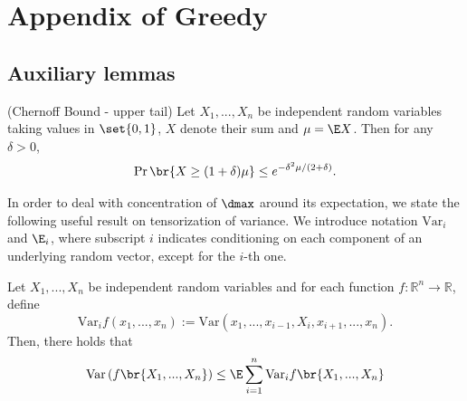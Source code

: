 \chapter{Appendix of Greedy}
\section{Auxiliary lemmas}\label{appendix:aux_lemmas}
%
\begin{lemma}\label{lemma:chernoff}(Chernoff Bound - upper tail)
Let $X_1, ..., X_n$ be independent random variables taking values in $\set{0, 1}$, $X$ denote their sum and $\mu = \E X$. Then for any $\delta > 0$,
    \begin{align*}
        \Pr\br{X \geq (1+\delta)\mu}\leq e^{-\delta^2 \mu / (2+\delta)}.
    \end{align*}
\end{lemma}


\noindent
In order to deal with concentration of $\dmax$ around its expectation, we state the following useful result on tensorization of variance. We introduce notation \(\text{Var}_i\) and \(\E_i\), where subscript $i$ indicates conditioning on each component of an underlying random vector, except for the $i$-th one.
\begin{lemma}\label{lemma:tensorization_var}
Let $X_1,...,X_n$ be independent random variables and for each function $f:\mathbb{R}^n \rightarrow \mathbb{R}$, define 
\[\text{Var}_i f(x_1,...,x_n) := \text{Var}\left(x_1,...,x_{i-1},X_i,x_{i+1},...,x_n\right).\]
Then, there holds that 
\[\text{Var} \left(f\br{X_1,...,X_n}\right ) \leq \E \sum_{i = 1}^n \text{Var}_i f\br{X_1,...,X_n}\]
\end{lemma}



